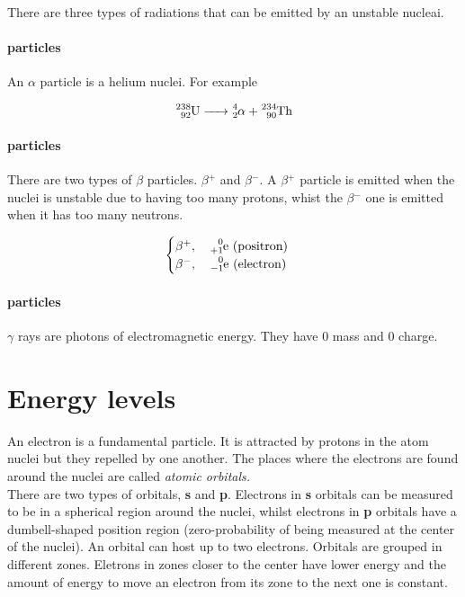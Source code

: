 \documentclass[a4paper]{article}
\begin{document}
There are three types of radiations that can be emitted by an unstable nucleai.

\paragraph{\alpha{} particles}

An \(\alpha\) particle is a helium nuclei. For example

\[
    \ce{^238_92U -> ^4_2\alpha{} + ^234_90Th}
\]

\paragraph{\beta{} particles}

There are two types of \(\beta{}\) particles. \(\beta{}^+\) and \(\beta{}^-\).
A \(\beta{}^+\) particle is emitted when the nuclei is unstable due to
having too many protons, whist the \(\beta{}^-\) one is emitted when it has
too many neutrons.

\[
    \begin{cases}
        \beta{}^+,\quad \ce{^0_{+1}e} \text{ (positron)} \\
        \beta{}^-,\quad \ce{^0_{-1}e} \text{ (electron)}
    \end{cases}
\]

\paragraph{\gamma{} particles}

\(\gamma\) rays are photons of electromagnetic energy. They have \(0\) mass and \(0\) charge.

\pagebreak

\section{Energy levels}

An electron is a fundamental particle. It is attracted by protons in the
atom nuclei but they repelled by one another.
The places where the electrons are found around the nuclei are called
\textit{atomic orbitals.} \\
There are two types of orbitals, \textbf{s} and \textbf{p}.
Electrons in \textbf{s} orbitals can be measured to be in a spherical region around the nuclei,
whilst electrons in \textbf{p} orbitals have a dumbell-shaped position region
(zero-probability of being measured at the center of the nuclei).
An orbital can host up to two electrons.
Orbitals are grouped in different zones.
Eletrons in zones closer to the center have lower energy and the amount of energy
to move an electron from its zone to the next one is constant.
\end{document}
